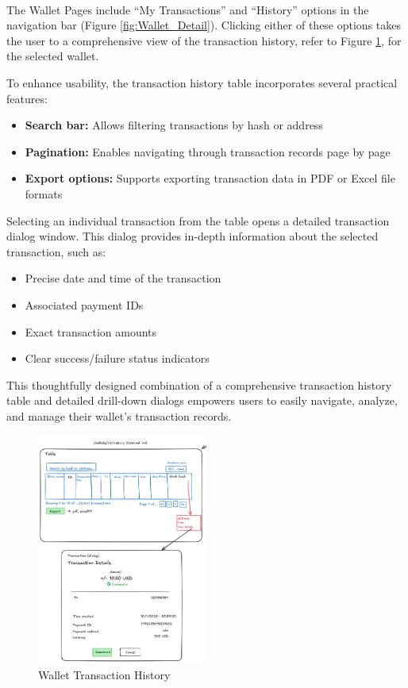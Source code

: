 \paragraph{} The Wallet Pages include ``My Transactions'' and ``History'' options in the navigation bar (Figure \ref{fig:Wallet_Detail}). Clicking either of these options takes the user to a comprehensive view of the transaction history, refer to Figure \ref{fig:history}, for the selected wallet.

To enhance usability, the transaction history table incorporates several practical features:

\begin{itemize}
  \item \textbf{Search bar:} Allows filtering transactions by hash or address
  \item \textbf{Pagination:} Enables navigating through transaction records page by page
  \item \textbf{Export options:} Supports exporting transaction data in PDF or Excel file formats
\end{itemize}

Selecting an individual transaction from the table opens a detailed transaction dialog window. This dialog provides in-depth information about the selected transaction, such as:

\begin{itemize}
  \item Precise date and time of the transaction
  \item Associated payment IDs
  \item Exact transaction amounts
  \item Clear success/failure status indicators
\end{itemize}

This thoughtfully designed combination of a comprehensive transaction history table and detailed drill-down dialogs empowers users to easily navigate, analyze, and manage their wallet's transaction records.
\begin{figure}[h!]
    \centering
    \includegraphics[width= 0.5\textwidth, height=0.73\textheight, keepaspectratio]{figures/test.jpg}
     \caption{Wallet Transaction History}
    \label{fig:history}
\end{figure}

